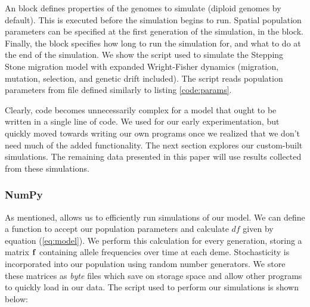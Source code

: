 

An  block defines properties of the genomes to simulate (diploid genomes by default). This is executed before the simulation begins to run. Spatial population parameters can be specified at the first generation of the simulation, in the  block. Finally, the  block specifies how long to run the simulation for, and what to do at the end of the simulation. We show the script used to simulate the Stepping Stone migration model with expanded Wright-Fisher dynamics (migration, mutation, selection, and genetic drift included). The script reads population parameters from  file defined similarly to listing \ref{code:params}. 




Clearly,  code becomes unnecessarily complex for a model that ought to be written in a single line of code. We used  for our early experimentation, but quickly moved towards writing our own programs once we realized that we don't need much of the added  functionality. The next section explores our custom-built simulations. The remaining data presented in this paper will use results collected from these  simulations.

\subsubsection{NumPy}

As mentioned,  allows us to efficiently run simulations of our model. We can define a  function to accept our population parameters and calculate $df$ given by equation (\ref{eq:model}). We perform this calculation for every generation, storing a matrix $\bf{f}$ containing allele frequencies over time at each deme. Stochasticity is incorporated into our population using  random number generators. We store these matrices as  \textit{byte} files which save on storage space and allow other  programs to quickly load in our data. The script used to perform our simulations is shown below:



